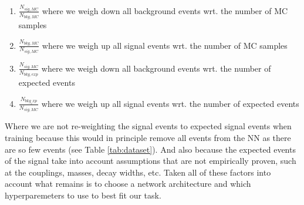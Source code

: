 \documentclass[12pt, a4paper]{book}
\begin{document}
\begin{enumerate}
   \item $\frac{N_{sig,MC}}{N_{bkg,MC}}$ where we weigh down all background events wrt. the number of MC samples
   \item $\frac{N_{bkg,MC}}{N_{sig,MC}}$ where we weigh up all signal events wrt. the number of MC samples
   \item $\frac{N_{sig,MC}}{N_{bkg,exp}}$ where we weigh down all background events wrt. the number of expected events
   \item $\frac{N_{bkg_exp}}{N_{sig,MC}}$ where we weigh up all signal events wrt. the number of expected events
\end{enumerate}
Where we are not re-weighting the signal events to expected signal events when training because this would in principle remove all events from the NN as there are so few events (see Table \ref{tab:dataset}). And also because the expected events of the signal take into account assumptions that are not empirically proven, 
such at the couplings, masses, decay widths, etc. Taken all of these factors into account what remains is to choose a network architecture and which hyperparemeters to use to best fit our task.


\clearpage
\end{document}
